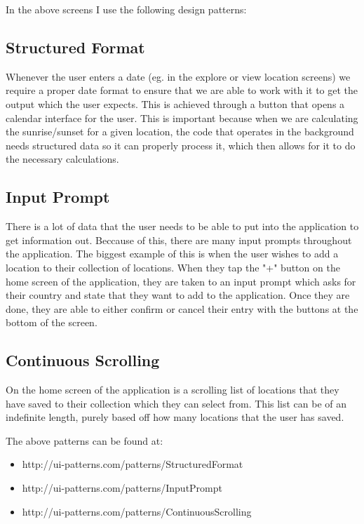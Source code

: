 \documentclass{scrartcl}
\begin{document}
In the above screens I use the following design patterns:

\subsection*{Structured Format}
Whenever the user enters a date (eg. in the explore or view location screens) we require
a proper date format to ensure that we are able to work with it to get the output which
the user expects. This is achieved through a button that opens a calendar interface for
the user. This is important because when we are calculating the sunrise/sunset for a given
location, the code that operates in the background needs structured data so it can properly
process it, which then allows for it to do the necessary calculations.

\subsection*{Input Prompt}
There is a lot of data that the user needs to be able to put into the application to get
information out. Beccause of this, there are many input prompts throughout the application.
The biggest example of this is when the user wishes to add a location to their collection
of locations. When they tap the "+" button on the home screen of the application, they
are taken to an input prompt which asks for their country and state that they want to add
to the application. Once they are done, they are able to either confirm or cancel their
entry with the buttons at the bottom of the screen.

\subsection*{Continuous Scrolling}
On the home screen of the application is a scrolling list of locations that they have saved
to their collection which they can select from. This list can be of an indefinite length,
purely based off how many locations that the user has saved.

\bigskip

The above patterns can be found at:
\begin{itemize}
    \item http://ui-patterns.com/patterns/StructuredFormat
    \item http://ui-patterns.com/patterns/InputPrompt
    \item http://ui-patterns.com/patterns/ContinuousScrolling
\end{itemize}
\end{document}
